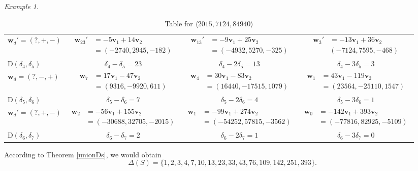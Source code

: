 \documentclass[11pt]{amsart}
\theoremstyle{remark}
\newtheorem{example}[theorem]{Example}
\begin{document}
\begin{example}
\begin{table}[h]
{\begin{tabular}{l|ccc}
 \hline

   $\mathbf w_d'=(?,+,-)$ &$\begin{aligned} \mathbf w_{23}' &=-5\mathbf v_1+14\mathbf v_2 \\ &= ( -2740, 2945, -182 )\end{aligned}$ & $\begin{aligned} \mathbf w_{13}'& =-9\mathbf v_1+25\mathbf v_2 \\&= ( -4932, 5270, -325)\end{aligned}$ & $\begin{aligned} \mathbf w_{3}' & = -13\mathbf v_1+36\mathbf v_2 \\& (-7124, 7595, -468)\end{aligned}$ \\
 $\mathrm D(\delta_4,\delta_5)$  &  $\delta_4-\delta_5=23$ & $\delta_4-2\delta_5=13$ & $\delta_4-3\delta_5=3$ \\
 
\hline
  $\mathbf w_d = (?,-,+)$ & $\begin{aligned} \mathbf w_{7} & =17\mathbf v_1-47\mathbf v_2\\ &=(9316, -9920, 611) \end{aligned}$ & $\begin{aligned}\mathbf w_{4}& =30\mathbf v_1-83\mathbf v_2\\ &= (16440, -17515, 1079)\end{aligned}$ & $\begin{aligned} \mathbf w_{1} &=43\mathbf v_1-119\mathbf v_2\\&= (23564, -25110, 1547)\end{aligned}$ \\ 
  $\mathrm D(\delta_5,\delta_6)$ & $\delta_5-\delta_6=7$ & $\delta_5-2\delta_6=4$ & $\delta_5-3\delta_6=1$ \\
  
\hline
 $\mathbf w_d'=(?,+,-)$ & $\begin{aligned} \mathbf w_{2} & =-56\mathbf v_1+155\mathbf v_2 \\ &=(-30688, 32705, -2015) \end{aligned}$ &  $\begin{aligned} \mathbf w_1 & =-99\mathbf v_1+274\mathbf v_2 \\ &=(-54252, 57815, -3562)\end{aligned}$ & $\begin{aligned} \mathbf w_0 & =-142\mathbf v_1+393\mathbf v_2\\  &=( -77816, 82925, -5109) \end{aligned}$  \\ 
 $\mathrm D(\delta_6,\delta_7)$ & $\delta_6-\delta_7=2$ & $\delta_6-2\delta_7=1$ & $\delta_6-3\delta_7=0$ \\ 
 
\hline
\end{tabular}
}\caption{Table for $\langle 2015, 7124, 84940\rangle$}
\end{table}

According to Theorem \ref{unionDs},  we would obtain
\[
\Delta(S)=\{1,2,3,4,7,10,13,23,33,43,76,109,142,251,393\}.
\]
\end{example}
\end{document}
